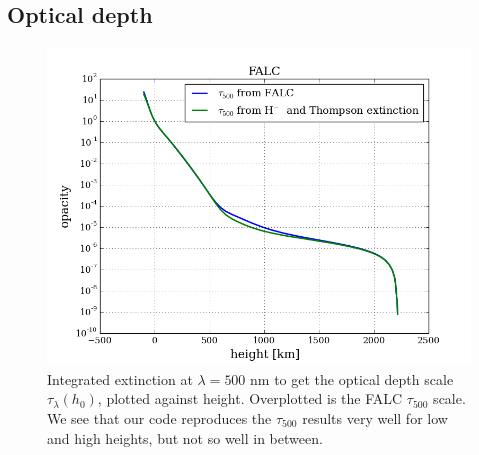 \documentclass{article}
\begin{document}
\subsection{Optical depth}
\begin{figure}[H]
  \centering
  \includegraphics[scale=0.5]{../figures/task2/exthmin_h_tau.png}
  \caption{Integrated extinction at $\lambda=500$ nm to get the optical depth scale $\tau_{\lambda}(h_0)$, plotted against height. Overplotted is the FALC $\tau_{500}$ scale. We see that our code reproduces the $\tau_{500}$ results very well for low and high heights, but not so well in between.}
\end{figure}
\end{document}
